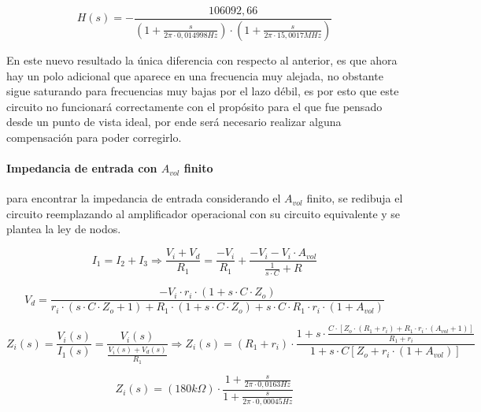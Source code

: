 \begin{equation}
	H(s) = - \frac{106092,66}{(1 + \frac{s}{2 \pi \cdot 0,014998Hz}) \cdot (1 + \frac{s}{2 \pi \cdot 15,0017MHz})}
	\label{eq:integrador_transfer_polo_dominante}
\end{equation}

En este nuevo resultado la \'unica diferencia con respecto al anterior, es que ahora hay un polo adicional que aparece en una frecuencia muy alejada, no obstante sigue saturando para frecuencias muy bajas por el lazo d\'ebil, es por esto que este circuito no funcionar\'a correctamente con el prop\'osito para el que fue pensado desde un punto de vista ideal, por ende ser\'a necesario realizar alguna compensaci\'on para poder corregirlo.

\paragraph*{Impedancia de entrada con $A_{vol}$ finito} para encontrar la impedancia de entrada considerando el $A_{vol}$ finito, se redibuja el circuito reemplazando al amplificador operacional con su circuito equivalente y se plantea la ley de nodos.


\begin{equation*}
	I_1 = I_2 + I_3 \Rightarrow
	\frac{V_i + V_d}{R_1} = 
	\frac{-V_i}{R_1} + \frac{- V_i - V_i \cdot A_{vol}}{\frac{1}{s \cdot C} + R}
\end{equation*}

\begin{equation*}
	V_d = \frac{- V_i \cdot r_i \cdot ( 1 + s \cdot C \cdot Z_o)}{r_i \cdot(s \cdot C \cdot Z_o + 1) + R_1 \cdot (1 + s \cdot C \cdot Z_o) + s \cdot C \cdot R_1 \cdot r_i \cdot (1 + A_{vol})}
\end{equation*}

\begin{equation*}
	Z_i(s) = \frac{V_i(s)}{I_1(s)} = \frac{V_i(s)}{\frac{V_i(s) + V_d(s)}{R_1}}
	\Rightarrow
	Z_i(s) = (R_1 + r_i) \cdot \frac{1 + s \cdot \frac{C \cdot \left[ Z_o \cdot (R_1 + r_i) + R_1 \cdot r_i \cdot (A_{vol} + 1) \right]}{R_1 + r_i}}{1 + s \cdot C \left[ Z_o + r_i \cdot ( 1 + A_{vol}) \right]}
\end{equation*}

\begin{equation}
	Z_i(s) = (180k \Omega) \cdot \frac{1 + \frac{s}{2 \pi \cdot 0,0163Hz}}{1 + \frac{s}{2 \pi \cdot 0,00045Hz}}
	\label{eq:integrador_impedancia_avol_finito}
\end{equation}

